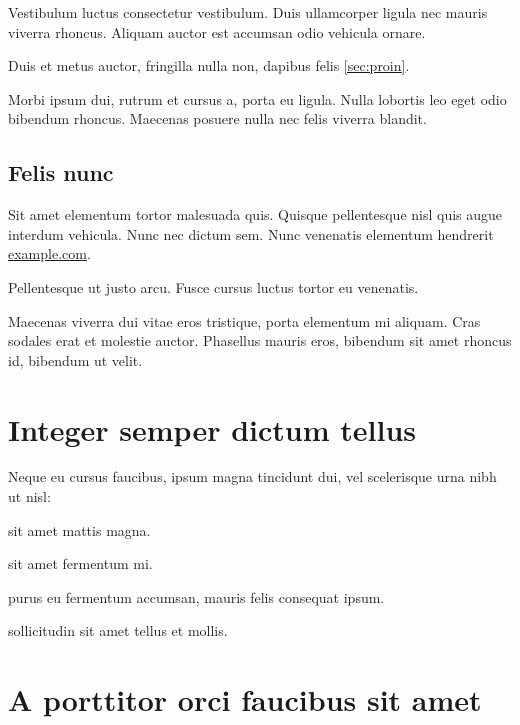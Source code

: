 Vestibulum luctus consectetur vestibulum. Duis ullamcorper ligula nec mauris
viverra rhoncus. Aliquam auctor est accumsan odio vehicula ornare.

\begin{remark}
Duis et metus auctor, fringilla nulla non, dapibus felis \ref{sec:proin}.
\end{remark}

Morbi ipsum dui, rutrum et cursus a, porta eu ligula. Nulla lobortis leo eget
odio bibendum rhoncus. Maecenas posuere nulla nec felis viverra blandit.

\subsection{Felis nunc}

Sit amet elementum tortor malesuada quis. Quisque pellentesque nisl quis augue
interdum vehicula. Nunc nec dictum sem. Nunc venenatis elementum hendrerit \href{https://example.com/}{example.com}.

\begin{remark}
Pellentesque ut justo arcu. Fusce cursus luctus tortor eu venenatis.
\end{remark}

Maecenas viverra dui vitae eros tristique, porta elementum mi aliquam. Cras
sodales erat et molestie auctor. Phasellus mauris eros, bibendum sit amet
rhoncus id, bibendum ut velit.


\section*{Integer semper dictum tellus}

Neque eu cursus faucibus, ipsum magna tincidunt dui, vel scelerisque urna nibh ut nisl:

\begin{description}[labelwidth=\widthof{\bfseries morbi convallis},align=left]
\item[Duis]{sit amet mattis magna.}
\item[Curabitur]{sit amet fermentum mi.}
\item[Morbi convallis]{purus eu fermentum accumsan, mauris felis consequat ipsum.}
\item[Ut]{sollicitudin sit amet tellus et mollis.}
\end{description}

\section*{A porttitor orci faucibus sit amet}

